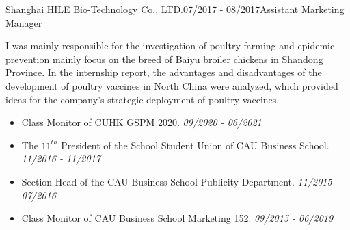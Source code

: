 \documentclass{joel_cv}
\begin{document}
%
%



\begin{sectionContentNormal}{Shanghai HILE Bio-Technology Co., LTD.}{07/2017 - 08/2017}{Assistant Marketing Manager}
	\item I was mainly responsible for the investigation of poultry farming and epidemic prevention mainly focus on the breed of Baiyu broiler chickens in Shandong Province. In the internship report, the advantages and disadvantages of the development of poultry vaccines in North China were analyzed, which provided ideas for the company's strategic deployment of poultry vaccines.
\end{sectionContentNormal}



\begin{itemize}
	\item Class Monitor of CUHK GSPM 2020.   \hfill \emph{09/2020 - 06/2021}
	\item The $11^{th}$ President of the School Student Union of CAU Business School. \hfill \emph{11/2016 - 11/2017}
	\item Section Head of the CAU Business School Publicity Department. \hfill \emph{11/2015 - 07/2016}
	\item Class Monitor of CAU  Business School Marketing 152. \hfill \emph{09/2015 - 06/2019}
	
\end{itemize}




\end{document}
